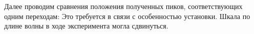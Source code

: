 Далее проводим сравнения положения полученных пиков, соответствующих одним переходам:
Это требуется в связи с особенностью установки. Шкала по длине волны в ходе эксперимента 
могла сдвинуться.

\begin{figure}[h!]
	\label{fig:image}
\end{figure}

\begin{figure}[h!]
	\label{fig:image}
\end{figure}

\begin{figure}[h!]
	\label{fig:image}
\end{figure}

